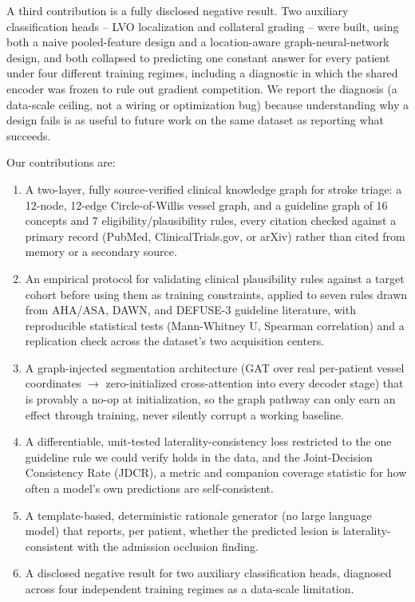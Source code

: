 \documentclass[conference]{IEEEtran}
\begin{document}
A third contribution is a fully disclosed negative result. Two auxiliary classification heads -- LVO localization and collateral grading -- were built, using both a naive pooled-feature design and a location-aware graph-neural-network design, and both collapsed to predicting one constant answer for every patient under four different training regimes, including a diagnostic in which the shared encoder was frozen to rule out gradient competition. We report the diagnosis (a data-scale ceiling, not a wiring or optimization bug) because understanding why a design fails is as useful to future work on the same dataset as reporting what succeeds.

Our contributions are:
\begin{enumerate}
\item A two-layer, fully source-verified clinical knowledge graph for stroke triage: a 12-node, 12-edge Circle-of-Willis vessel graph, and a guideline graph of 16 concepts and 7 eligibility/plausibility rules, every citation checked against a primary record (PubMed, ClinicalTrials.gov, or arXiv) rather than cited from memory or a secondary source.
\item An empirical protocol for validating clinical plausibility rules against a target cohort before using them as training constraints, applied to seven rules drawn from AHA/ASA, DAWN, and DEFUSE-3 guideline literature, with reproducible statistical tests (Mann-Whitney U, Spearman correlation) and a replication check across the dataset's two acquisition centers.
\item A graph-injected segmentation architecture (GAT over real per-patient vessel coordinates $\rightarrow$ zero-initialized cross-attention into every decoder stage) that is provably a no-op at initialization, so the graph pathway can only earn an effect through training, never silently corrupt a working baseline.
\item A differentiable, unit-tested laterality-consistency loss restricted to the one guideline rule we could verify holds in the data, and the Joint-Decision Consistency Rate (JDCR), a metric and companion coverage statistic for how often a model's own predictions are self-consistent.
\item A template-based, deterministic rationale generator (no large language model) that reports, per patient, whether the predicted lesion is laterality-consistent with the admission occlusion finding.
\item A disclosed negative result for two auxiliary classification heads, diagnosed across four independent training regimes as a data-scale limitation.

\end{enumerate}
\end{document}
